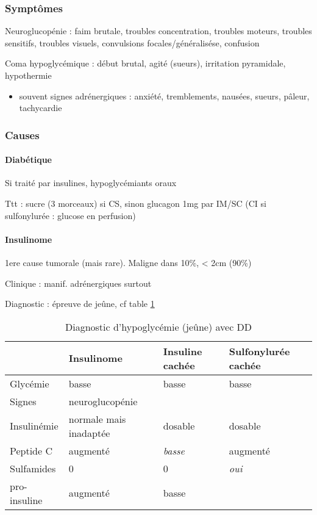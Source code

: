 \documentclass[11pt]{article}
\begin{document}
\subsubsection{Symptômes}
\label{sec:org58466c6}
Neuroglucopénie : faim brutale, troubles concentration, troubles moteurs,
troubles sensitifs, troubles visuels, convulsions focales/généralisése,
confusion

Coma hypoglycémique : début brutal, agité (sueurs), irritation pyramidale, hypothermie

\begin{itemize}
\item souvent signes adrénergiques : anxiété, tremblements, nausées, sueurs,
pâleur, tachycardie
\end{itemize}

\subsubsection{Causes}
\label{sec:org1774761}
\paragraph{Diabétique}
\label{sec:org4ebc963}
Si traité par insulines, hypoglycémiants oraux

Ttt : sucre (3 morceaux) si CS, sinon glucagon 1mg par IM/SC (CI si
sulfonylurée : glucose en perfusion)

\paragraph{Insulinome}
\label{sec:org18e1a55}
1ere cause tumorale (mais rare). Maligne dans 10\%, < 2cm (90\%)

Clinique : manif. adrénergiques surtout

Diagnostic : épreuve de jeûne, cf table \ref{tab:org36a6bfc}

\begin{table}[htbp]
\caption{\label{tab:org36a6bfc}Diagnostic d'hypoglycémie (jeûne) avec DD}
\centering
\begin{tabular}{llll}
 & Insulinome & Insuline cachée & Sulfonylurée cachée\\
\hline
Glycémie & basse & basse & basse\\
Signes & neuroglucopénie &  & \\
Insulinémie & normale mais inadaptée & dosable & dosable\\
Peptide C & augmenté & \emph{basse} & augmenté\\
Sulfamides & 0 & 0 & \emph{oui}\\
pro-insuline & augmenté & basse & \\
\end{tabular}
\end{table}
\end{document}
